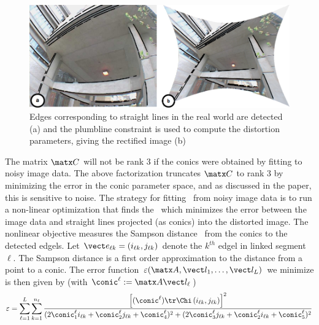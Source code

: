 \documentclass[extendedabs]{bmvc2k}
\begin{document}
\begin{figure}[t]
\includegraphics[width=\linewidth]{images/fig1.png}
\caption{
Edges corresponding to straight lines in the real world are
detected (a) and the plumbline constraint is used to compute the
distortion parameters, giving the rectified image (b)}
\vspace{-2mm}
\end{figure}

The matrix $\matx C$ will not be rank 3 if the conics were obtained by
fitting to noisy image data.  The above factorization truncates $\matx C$
to rank 3 by minimizing the error in the conic parameter space, and as
discussed in the paper, this is sensitive to noise.  The strategy for
fitting \A\ from noisy image data is to run a non-linear optimization that
finds the \A\ which minimizes the error between the image data and straight
lines projected (as conics) into the distorted image.  The nonlinear
objective measures the Sampson distance~\cite{Hartley00} from the conics to
the detected edgels.  Let $\vect e_{\ell k} = (i_{\ell k},j_{\ell k})$
denote the $k^{th}$ edgel in linked segment $\ell$. The Sampson distance is
a first order approximation to the distance from a point to a conic. The
error function $\varepsilon(\matx A, \vect l_1, \ldots, \vect l_L)$ we
minimize is then given by (with $\conic^\ell := \matx A \vect l_\ell$)
\begin{equation}
\def\t#1{\conic^\ell_{#1}}
\varepsilon =
\sum_{\ell = 1}^{L} \sum_{k=1}^{n_\ell }
\frac
{\left[(\conic^\ell)\tr\Chi\left(i_{\ell k},j_{\ell k}\right)\right]^2}
{(2\t1 i_{\ell k} + \t2 j_{\ell k} + \t4)^2 + (2\t3 j_{\ell k} +
\t2 i_{\ell k} + \t5)^2}
\nonumber
\end{equation}
\end{document}
